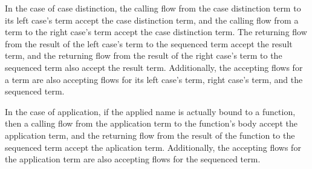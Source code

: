 \documentclass[letterpaper, 11pt]{extarticle}
\begin{document}
In the case of case distinction, the calling flow from the case distinction term to
its left case's term accept the case distinction term, and
the calling flow from a term to
the right case's term accept the case distinction term.
The returning flow from the result of the
left case's term to the sequenced term accept the result term,
and the returning flow from the result of the right case's term to the sequenced term
also accept the result term. Additionally, the accepting flows for a term are also
accepting flows for its left case's term, right case's term,
and the sequenced term.  

In the case of application, if the applied name is actually bound to a function,
then a calling flow from the application term to the function's body 
accept the application term, and the returning flow from the result of the function
 to the sequenced term accept the aplication term.
Additionally, the accepting flows for the application term are also
accepting flows for the sequenced term. 
\end{document}
